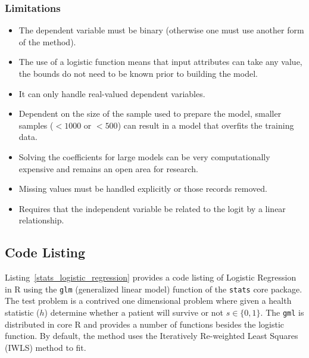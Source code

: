 \subsubsection{Limitations}

\begin{itemize}
	\item The dependent variable must be binary (otherwise one must use another form of the method).
	\item The use of a logistic function means that input attributes can take any value, the bounds do not need to be known prior to building the model.
	\item It can only handle real-valued dependent variables.
	\item Dependent on the size of the sample used to prepare the model, smaller samples ($<1000$ or $<500$) can result in a model that overfits the training data.
	\item Solving the coefficients for large models can be very computationally expensive and remains an open area for research.
	\item Missing values must be handled explicitly or those records removed.
	\item Requires that the independent variable be related to the logit by a linear relationship.
\end{itemize}


\subsection{Code Listing}
Listing~\ref{stats_logistic_regression} provides a code listing of Logistic Regression in R using the \texttt{glm} (generalized linear model) function of the \texttt{stats} core package. 
The test problem is a contrived one dimensional problem where given a health statistic ($h$) determine whether a patient will survive or not $s\in\{0,1\}$.
The \texttt{gml} is distributed in core R and provides a number of functions besides the logistic function. By default, the method uses the Iteratively Re-weighted Least Squares (IWLS) method to fit.




